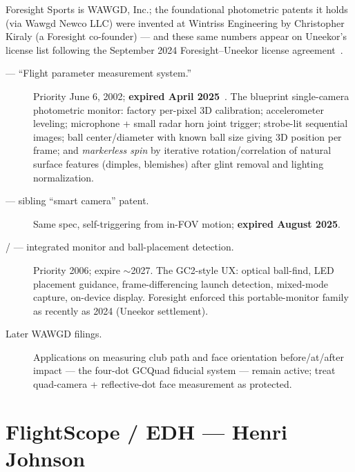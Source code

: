 Foresight Sports is WAWGD, Inc.; the foundational photometric patents it
holds (via Wawgd Newco LLC) were invented at Wintriss Engineering by
Christopher Kiraly (a Foresight co-founder) --- and these same numbers
appear on Uneekor's license list following the September 2024
Foresight--Uneekor license agreement~\cite{businesswireforesight}.

\begin{description}
\item[ --- ``Flight parameter measurement system.'']
Priority June 6, 2002; \textbf{expired April 2025}~\cite{us7292711}. The
blueprint single-camera photometric monitor: factory per-pixel 3D
calibration; accelerometer leveling; microphone + small radar horn joint
trigger; strobe-lit sequential images; ball center/diameter with known
ball size giving 3D position per frame; and \emph{markerless spin} by
iterative rotation/correlation of natural surface features (dimples,
blemishes) after glint removal and lighting normalization.
\item[ --- sibling ``smart camera'' patent.]
Same spec, self-triggering from in-FOV motion; \textbf{expired August
2025}.
\item[ /  --- integrated monitor
and ball-placement detection.] Priority 2006; expire $\sim$2027. The
GC2-style UX: optical ball-find, LED placement guidance, frame-differencing
launch detection, mixed-mode capture, on-device display. Foresight
enforced this portable-monitor family as recently as 2024 (Uneekor
settlement).
\item[Later WAWGD filings.] Applications on measuring club path and face
orientation before/at/after impact --- the four-dot GCQuad fiducial system
--- remain active; treat quad-camera + reflective-dot face measurement as
protected.
\end{description}

\section{FlightScope / EDH --- Henri Johnson}
\label{sec:patentflightscope}

